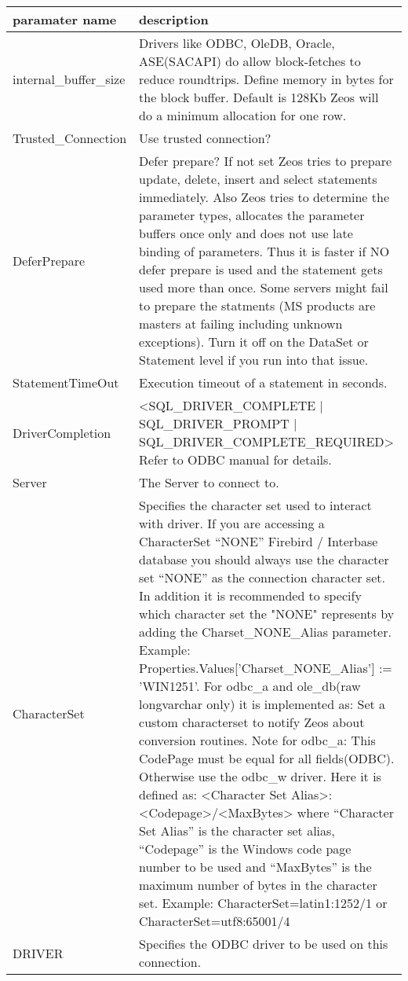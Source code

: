 \documentclass[a4paper,12pt,oneside]{article}
\begin{document}
\begin{tabularx}{\textwidth}{lX}
    paramater name & description \\ \hline
		internal\_buffer\_size & 
		  Drivers like ODBC, OleDB, Oracle, ASE(SACAPI) do allow block-fetches to reduce roundtrips.
      Define memory in bytes for the block buffer.
			Default is 128Kb
      Zeos will do a minimum allocation for one row. \\
		Trusted\_Connection &
		  Use trusted connection? \\
		DeferPrepare &
      Defer prepare? If not set Zeos tries to prepare update, delete, insert and select statements immediately.
      Also Zeos tries to determine the parameter types, allocates the parameter buffers once only and does not use late binding of parameters.
			Thus it is faster if NO defer prepare is used and the statement gets used more than once.
      Some servers might fail to prepare the statments (MS products are masters at failing including unknown exceptions).
			Turn it off on the DataSet or Statement level if you run into that issue. \\
		StatementTimeOut &
		  Execution timeout of a statement in seconds. \\
    DriverCompletion &
		  <SQL\_DRIVER\_COMPLETE | SQL\_DRIVER\_PROMPT | SQL\_DRIVER\_COMPLETE\_REQUIRED>
      Refer to ODBC manual for details. \\
		Server &
		  The Server to connect to. \\
		CharacterSet &
		  Specifies the character set used to interact with driver.
      If you are accessing a CharacterSet "`NONE"' Firebird / Interbase database you should always use the character set "`NONE"' as the connection character set.
			In addition it is recommended to specify which character set the "NONE" represents by adding the Charset\_NONE\_Alias parameter.
      Example: Properties.Values['Charset\_NONE\_Alias'] := 'WIN1251'.
      For odbc\_a and ole\_db(raw longvarchar only) it is implemented as:
      Set a custom characterset to notify Zeos about conversion routines.
      Note for odbc\_a: This CodePage must be equal for all fields(ODBC).
      Otherwise use the odbc\_w driver.
			Here it is defined as:
			<Character Set Alias>:<Codepage>/<MaxBytes> where "`Character Set Alias"' is the character set alias, "`Codepage"' is the Windows code page number to be used and "`MaxBytes"' is the maximum number of bytes in the character set.
			Example: CharacterSet=latin1:1252/1 or CharacterSet=utf8:65001/4 \\
		DRIVER &
		  Specifies the ODBC driver to be used on this connection. \\
\end{tabularx}
\end{document}
